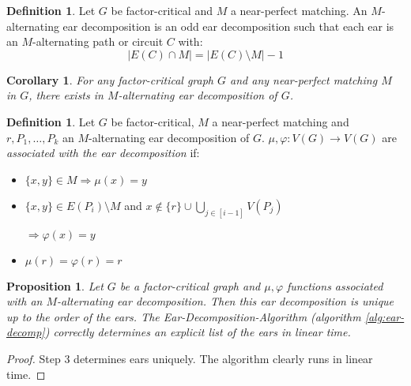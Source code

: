 \documentclass[11pt, a4paper]{article}
\newcommand{\abs}[1]{\left\lvert#1\right\rvert}
\newcommand{\set}[1]{\{#1\}}
\newtheorem{cor}[theorem]{Corollary}
\newtheorem{prop}[theorem]{Proposition}
\theoremstyle{remark}
\theoremstyle{definition}
\newtheorem{definition}[theorem]{Definition}
\begin{document}
\begin{definition}
	Let $G$ be factor-critical and $M$ a near-perfect matching.
	An $M$-alternating ear decomposition is an odd ear decomposition
	such that each ear is an $M$-alternating path or circuit $C$ with:
	\[\abs{E(C)\cap M}=\abs{E(C)\setminus M}-1\]
\end{definition}

\begin{cor}
	For any factor-critical graph $G$ and any near-perfect matching $M$ in $G$,
	there exists in $M$-alternating ear decomposition of $G$.
\end{cor}

\begin{definition}
	Let $G$ be factor-critical, $M$ a near-perfect matching and
	$r,P_1,\ldots,P_k$ an $M$-alternating ear decomposition of $G$.
	$\mu,\varphi: V(G)\to V(G)$ are \emph{associated with the ear
		decomposition} if:
	\begin{itemize}
		\item $\set{x,y}\in M\Rightarrow \mu(x)=y$
		\item $\set{x,y}\in E(P_i)\setminus M$ and $x\notin\set{r}
			\cup\bigcup_{j\in [i-1]}V(P_j)$

		$\Rightarrow \varphi(x)=y$
		\item $\mu(r)=\varphi(r)=r$
	\end{itemize}
\end{definition}

\begin{prop}\label{lemma:ear-decomp-repr}
	Let $G$ be a factor-critical graph and $\mu,\varphi$ functions associated
	with an $M$-alternating ear decomposition. Then this ear decomposition is
	unique up to the order of the ears. The Ear-Decomposition-Algorithm
	(algorithm \ref{alg:ear-decomp})
	correctly determines an explicit list of the ears in linear time.
\end{prop}
\begin{proof}
	Step 3 determines ears uniquely. The algorithm clearly runs in linear
	time.
\end{proof}
\end{document}
